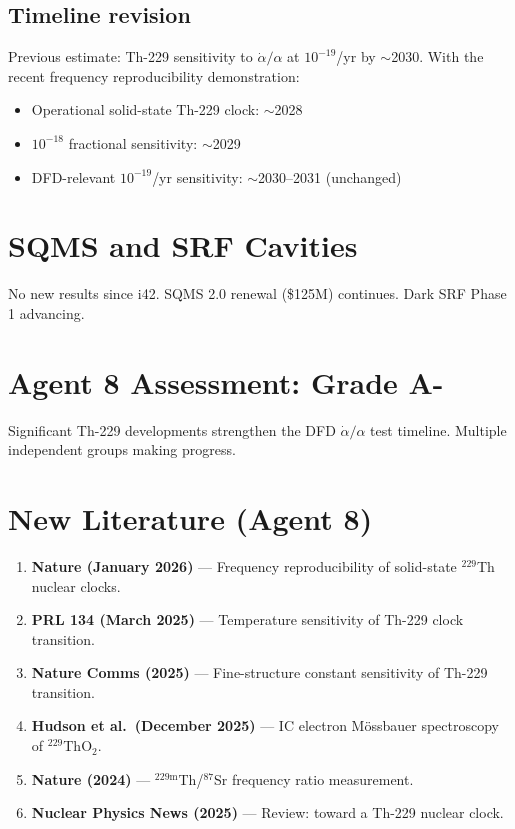 \documentclass[11pt,a4paper]{article}
\begin{document}
\subsection{Timeline revision}

Previous estimate: Th-229 sensitivity to $\dot{\alpha}/\alpha$ at $10^{-19}$/yr by $\sim$2030. With the recent frequency reproducibility demonstration:
\begin{itemize}
\item Operational solid-state Th-229 clock: $\sim$2028
\item $10^{-18}$ fractional sensitivity: $\sim$2029
\item DFD-relevant $10^{-19}$/yr sensitivity: $\sim$2030--2031 (unchanged)
\end{itemize}

\section{SQMS and SRF Cavities}

No new results since i42. SQMS 2.0 renewal (\$125M) continues. Dark SRF Phase 1 advancing.

\section{Agent 8 Assessment: Grade A-}

Significant Th-229 developments strengthen the DFD $\dot{\alpha}/\alpha$ test timeline. Multiple independent groups making progress.

\section{New Literature (Agent 8)}

\begin{enumerate}
\item \textbf{Nature (January 2026)} --- Frequency reproducibility of solid-state $^{229}$Th nuclear clocks.
\item \textbf{PRL 134 (March 2025)} --- Temperature sensitivity of Th-229 clock transition.
\item \textbf{Nature Comms (2025)} --- Fine-structure constant sensitivity of Th-229 transition.
\item \textbf{Hudson et al.\ (December 2025)} --- IC electron M\"ossbauer spectroscopy of $^{229}$ThO$_2$.
\item \textbf{Nature (2024)} --- $^{229\text{m}}$Th/$^{87}$Sr frequency ratio measurement.
\item \textbf{Nuclear Physics News (2025)} --- Review: toward a Th-229 nuclear clock.
\end{enumerate}
\end{document}
